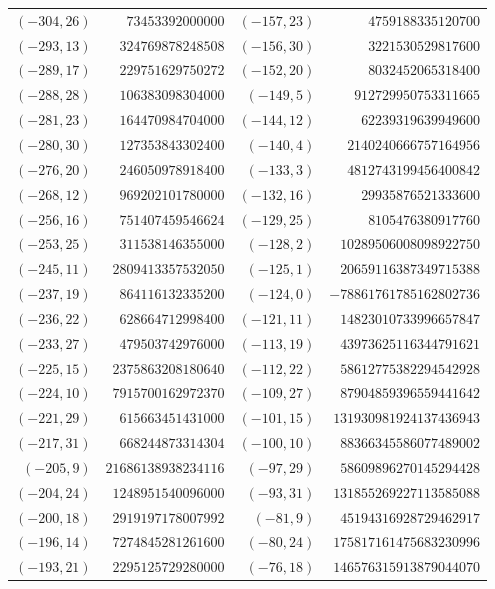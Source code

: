 \documentclass[11pt]{amsart}
\theoremstyle{definition}
\begin{document}
{\scriptsize\begin{tabular}{@{}r@{\ \ }r@{\qquad}r@{\ \ }r@{}}
$(-304,26)$ & $73453392000000$ & $(-157,23)$ & $4759188335120700$ \\
$(-293,13)$ & $324769878248508$ & $(-156,30)$ & $3221530529817600$ \\
$(-289,17)$ & $229751629750272$ & $(-152,20)$ & $8032452065318400$ \\
$(-288,28)$ & $106383098304000$ & $(-149,5)$ & $912729950753311665$ \\
$(-281,23)$ & $164470984704000$ & $(-144,12)$ & $62239319639949600$ \\
$(-280,30)$ & $127353843302400$ & $(-140,4)$ & $2140240666757164956$ \\
$(-276,20)$ & $246050978918400$ & $(-133,3)$ & $4812743199456400842$ \\
$(-268,12)$ & $969202101780000$ & $(-132,16)$ & $29935876521333600$ \\
$(-256,16)$ & $751407459546624$ & $(-129,25)$ & $8105476380917760$ \\
$(-253,25)$ & $311538146355000$ & $(-128,2)$ & $10289506008098922750$ \\
$(-245,11)$ & $2809413357532050$ & $(-125,1)$ & $20659116387349715388$ \\
$(-237,19)$ & $864116132335200$ & $(-124,0)$ & $-78861761785162802736$ \\
$(-236,22)$ & $628664712998400$ & $(-121,11)$ & $14823010733996657847$ \\
$(-233,27)$ & $479503742976000$ & $(-113,19)$ & $43973625116344791621$ \\
$(-225,15)$ & $2375863208180640$ & $(-112,22)$ & $58612775382294542928$ \\
$(-224,10)$ & $7915700162972370$ & $(-109,27)$ & $87904859396559441642$ \\
$(-221,29)$ & $615663451431000$ & $(-101,15)$ & $131930981924137436943$ \\
$(-217,31)$ & $668244873314304$ & $(-100,10)$ & $88366345586077489002$ \\
$(-205,9)$ & $21686138938234116$ & $(-97,29)$ & $58609896270145294428$ \\
$(-204,24)$ & $1248951540096000$ & $(-93,31)$ & $131855269227113585088$ \\
$(-200,18)$ & $2919197178007992$ & $(-81,9)$ & $45194316928729462917$ \\
$(-196,14)$ & $7274845281261600$ & $(-80,24)$ & $175817161475683230996$ \\
$(-193,21)$ & $2295125729280000$ & $(-76,18)$ & $146576315913879044070$ \\

\end{tabular}}
\end{document}
